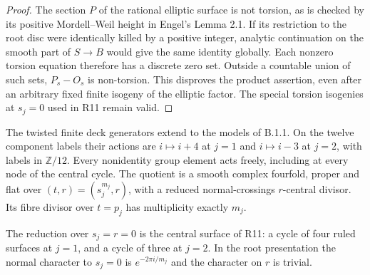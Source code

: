 \begin{proof}
The section $P$ of the rational elliptic surface is not
torsion, as is checked by its positive Mordell--Weil height
in Engel's Lemma 2.1. If its restriction to the root disc
were identically killed by a positive integer, analytic
continuation on the smooth part of $S\to B$ would give the
same identity globally. Each nonzero torsion equation
therefore has a discrete zero set. Outside a countable union
of such sets, $P_s-O_s$ is non-torsion. This disproves the
product assertion, even after an arbitrary fixed finite
isogeny of the elliptic factor. The special torsion
isogenies at $s_j=0$ used in R11 remain valid.
\end{proof}

\begin{theorem}[B.1.2; Proved]\label{push:B12}
The twisted finite deck generators extend to the models of
B.1.1. On the twelve component labels their actions are
$i\mapsto i+4$ at $j=1$ and $i\mapsto i-3$ at $j=2$,
with labels in $\mathbb Z/12$. Every nonidentity group
element acts freely, including at every node of the central
cycle. The quotient is a smooth complex fourfold, proper
and flat over $(t,r)=(s_j^{m_j},r)$, with a reduced
normal-crossings $r$-central divisor. Its fibre divisor
over $t=p_j$ has multiplicity exactly $m_j$.

The reduction over $s_j=r=0$ is the central surface of R11:
a cycle of four ruled surfaces at $j=1$, and a cycle of
three at $j=2$. In the root presentation the normal
character to $s_j=0$ is $e^{-2\pi i/m_j}$ and the
character on $r$ is trivial.
\end{theorem}
